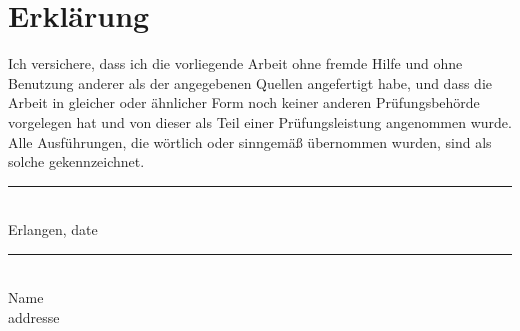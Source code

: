 \chapter*{Erklärung}
\thispagestyle{empty}

\noindent
Ich versichere, dass ich die vorliegende Arbeit ohne fremde Hilfe und ohne Benutzung anderer als der angegebenen Quellen angefertigt habe, und dass die Arbeit in gleicher oder ähnlicher Form noch keiner anderen Prüfungsbehörde vorgelegen hat und von dieser als Teil einer Prüfungsleistung angenommen wurde.
Alle Ausführungen, die wörtlich oder sinngemäß übernommen wurden, sind als solche gekennzeichnet.

\vspace{3cm}

\begin{minipage}[t]{0.45\textwidth}
    \rule{\textwidth}{0.5pt}\\
	Erlangen, date
\end{minipage}
\hfill
\begin{minipage}[t]{0.45\textwidth}
	\rule{\textwidth}{0.5pt}\\
	Name\\
    addresse\\
\end{minipage}
